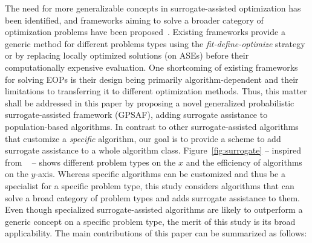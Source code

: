 \documentclass[journal]{IEEEtran}
\begin{document}
The need for more generalizable concepts in surrogate-assisted optimization has been identified, and frameworks aiming to solve a broader category of optimization problems have been proposed~\cite{2010-lim-generalizing,2020-cai-generalied-high-dim}. Existing frameworks provide a generic method for different problems types using the \emph{fit-define-optimize} strategy or by replacing locally optimized solutions (on ASEs) before their computationally expensive evaluation. 
One shortcoming of existing frameworks for solving EOPs is their design being primarily algorithm-dependent and their limitations to transferring it to different optimization methods.
Thus, this matter shall be addressed in this paper by proposing a novel generalized probabilistic surrogate-assisted framework (GPSAF), adding surrogate assistance to population-based algorithms.
In contrast to other surrogate-assisted algorithms that customize a \emph{specific} algorithm, our goal is to provide a scheme to add surrogate assistance to a whole algorithm class. 
Figure~\ref{fig:surrogate} -- inspired from 
~\cite{1989-goldberg-ga} -- shows different problem types on the $x$ and the efficiency of algorithms on the $y$-axis. Whereas specific algorithms can be customized and thus be a specialist for a specific problem type, this study considers algorithms that can solve a broad category of problem types and adds surrogate assistance to them.
Even though specialized surrogate-assisted algorithms are likely to outperform a generic concept on a specific problem type, the merit of this study is its broad applicability.
The main contributions of this paper can be summarized as follows:
\end{document}
